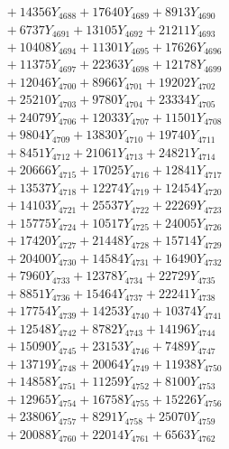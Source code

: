 \documentclass[a4paper,10pt]{article}
\begin{document}
{\begin{align}
&\;  + 14356 Y_{4688} + 17640 Y_{4689} + 8913 Y_{4690} \\[0.3ex]
&\;  + 6737 Y_{4691} + 13105 Y_{4692} + 21211 Y_{4693} \\[0.3ex]
&\;  + 10408 Y_{4694} + 11301 Y_{4695} + 17626 Y_{4696} \\[0.3ex]
&\;  + 11375 Y_{4697} + 22363 Y_{4698} + 12178 Y_{4699} \\[0.3ex]
&\;  + 12046 Y_{4700} + 8966 Y_{4701} + 19202 Y_{4702} \\[0.3ex]
&\;  + 25210 Y_{4703} + 9780 Y_{4704} + 23334 Y_{4705} \\[0.3ex]
&\;  + 24079 Y_{4706} + 12033 Y_{4707} + 11501 Y_{4708} \\[0.5ex]\allowbreak
&\;  + 9804 Y_{4709} + 13830 Y_{4710} + 19740 Y_{4711} \\[0.3ex]
&\;  + 8451 Y_{4712} + 21061 Y_{4713} + 24821 Y_{4714} \\[0.3ex]
&\;  + 20666 Y_{4715} + 17025 Y_{4716} + 12841 Y_{4717} \\[0.3ex]
&\;  + 13537 Y_{4718} + 12274 Y_{4719} + 12454 Y_{4720} \\[0.3ex]
&\;  + 14103 Y_{4721} + 25537 Y_{4722} + 22269 Y_{4723} \\[0.3ex]
&\;  + 15775 Y_{4724} + 10517 Y_{4725} + 24005 Y_{4726} \\[0.3ex]
&\;  + 17420 Y_{4727} + 21448 Y_{4728} + 15714 Y_{4729} \\[0.3ex]
&\;  + 20400 Y_{4730} + 14584 Y_{4731} + 16490 Y_{4732} \\[0.3ex]
&\;  + 7960 Y_{4733} + 12378 Y_{4734} + 22729 Y_{4735} \\[0.3ex]
&\;  + 8851 Y_{4736} + 15464 Y_{4737} + 22241 Y_{4738} \\[0.5ex]\allowbreak
&\;  + 17754 Y_{4739} + 14253 Y_{4740} + 10374 Y_{4741} \\[0.3ex]
&\;  + 12548 Y_{4742} + 8782 Y_{4743} + 14196 Y_{4744} \\[0.3ex]
&\;  + 15090 Y_{4745} + 23153 Y_{4746} + 7489 Y_{4747} \\[0.3ex]
&\;  + 13719 Y_{4748} + 20064 Y_{4749} + 11938 Y_{4750} \\[0.3ex]
&\;  + 14858 Y_{4751} + 11259 Y_{4752} + 8100 Y_{4753} \\[0.3ex]
&\;  + 12965 Y_{4754} + 16758 Y_{4755} + 15226 Y_{4756} \\[0.3ex]
&\;  + 23806 Y_{4757} + 8291 Y_{4758} + 25070 Y_{4759} \\[0.3ex]
&\;  + 20088 Y_{4760} + 22014 Y_{4761} + 6563 Y_{4762} \\[0.3ex]

\end{align}}
\end{document}
